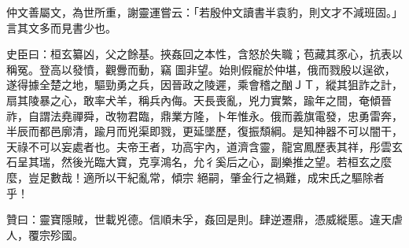 \begin{pinyinscope}
 仲文善屬文，為世所重，謝靈運嘗云：「若殷仲文讀書半袁豹，則文才不減班固。」言其文多而見書少也。



 史臣曰：桓玄纂凶，父之餘基。挾姦回之本性，含怒於失職；苞藏其豕心，抗表以稱冤。登高以發憤，觀釁而動，竊
 圖非望。始則假寵於仲堪，俄而戮殷以逞欲，遂得據全楚之地，驅勁勇之兵，因晉政之陵遲，乘會稽之酗ＪＴ，縱其狙詐之計，扇其陵暴之心，敢率犬羊，稱兵內侮。天長喪亂，兇力實繁，踰年之間，奄傾晉祚，自謂法堯禪舜，改物君臨，鼎業方隆，卜年惟永。俄而義旗電發，忠勇雷奔，半辰而都邑廓清，踰月而兇渠即戮，更延墜歷，復振頹綱。是知神器不可以闇干，天祿不可以妄處者也。夫帝王者，功高宇內，道濟含靈，龍宮鳳歷表其祥，彤雲玄石呈其瑞，然後光臨大寶，克享鴻名，允彳奚后之心，副樂推之望。若桓玄之麼麼，豈足數哉！適所以干紀亂常，傾宗
 絕嗣，肇金行之禍難，成宋氏之驅除者乎！



 贊曰：靈寶隱賊，世載兇德。信順未孚，姦回是則。肆逆遷鼎，憑威縱慝。違天虐人，覆宗殄國。



\end{pinyinscope}